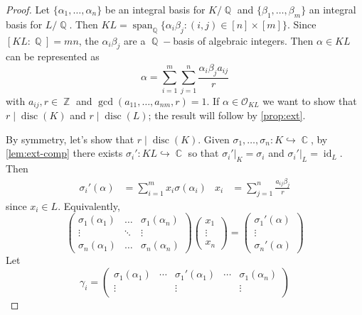 \documentclass[11pt, a4paper]{memoir}
\DeclareMathOperator{\Q}{{\mathbb{Q}}}
\DeclareMathOperator{\Z}{{\mathbb{Z}}}
\DeclareMathOperator{\C}{{\mathbb{C}}}
\newcommand{\hto}[0]{\ensuremath{\hookrightarrow}}
\theoremstyle{change}
\theoremstyle{plain}
\theoremstyle{nonumberplain}
\newtheorem{proof}{Proof}
\DeclareMathOperator{\disc}{disc}
\DeclareMathOperator{\id}{id}
\DeclareMathOperator{\spn}{span}
\numberwithin{equation}{section}
\begin{document}
\begin{proof}
    Let $\{\alpha_1,\ldots,\alpha_n\}$ be an integral basis for $K/\Q$ and $\{\beta_1,\ldots,\beta_m\}$ an integral basis for $L/\Q$.
    Then $KL=\spn_{\Q}\{\alpha_i\beta_j:(i,j)\in[n]\times[m]\}$.
    Since $[KL:\Q]=mn$, the $\alpha_i\beta_j$ are a $\Q-$basis of algebraic integers.
    Then $\alpha\in KL$ can be represented as
    \begin{equation*}
        \alpha=\sum\limits_{i=1}^m\sum\limits_{j=1}^n\frac{\alpha_i\beta_ja_{ij}}{r}
    \end{equation*}
    with $a_{ij},r\in\Z$ and $\gcd(a_{11},\ldots,a_{nm},r)=1$.
    If $\alpha\in\mathcal{O}_{KL}$ we want to show that $r\mid\disc(K)$ and $r\mid\disc(L)$; the result will follow by \cref{prop:ext}.
    
    By symmetry, let's show that $r\mid\disc(K)$.
    Given $\sigma_1,\ldots,\sigma_n:K\hto\C$, by \cref{lem:ext-comp} there exists $\sigma_i':KL\hto\C$ so that $\sigma_i'|_K=\sigma_i$ and $\sigma_i'|_L=\id_L$.
    Then
    \begin{align*}
        \sigma_i'(\alpha)&= \sum\limits_{i=1}^m x_i\sigma(\alpha_i)& x_i&=\sum\limits_{j=1}^n\frac{a_{ij}\beta_j}{r}
    \end{align*}
    since $x_i\in L$.
    Equivalently,
    \begin{equation*}
        \begin{pmatrix}
            \sigma_1(\alpha_1)&\hdots&\sigma_1(\alpha_n)\\
            \vdots&\ddots&\vdots\\
            \sigma_n(\alpha_1)&\hdots&\sigma_n(\alpha_n)
        \end{pmatrix}
        \begin{pmatrix}
            x_1\\\vdots\\x_n
        \end{pmatrix}
        =
        \begin{pmatrix}
            \sigma_1'(\alpha)\\\vdots\\\sigma_n'(\alpha)
        \end{pmatrix}
    \end{equation*}
    Let
    \begin{equation*}
        \gamma_i=
        \begin{pmatrix}
            \sigma_1(\alpha_1)&\cdots&\sigma_1'(\alpha_1)&\cdots&\sigma_1(\alpha_n)\\
            \vdots&&\vdots&&\vdots\\

\end{pmatrix}
\end{equation*}
\end{proof}
\end{document}
